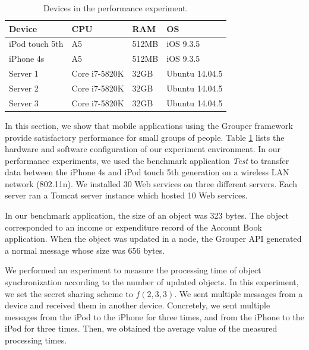 \documentclass[a4paper,11pt]{report}
\begin{document}
\begin{table}[t]
	\centering
	\caption{Devices in the performance experiment.}
	\label{table:experiment_devices}
	\begin{tabular}{llll}
		\toprule
		\textbf{Device} & \textbf{CPU} & \textbf{RAM} & \textbf{OS} \\ 
		\midrule
		iPod touch 5th & A5 & 512MB & iOS 9.3.5 \\
		iPhone 4s & A5 & 512MB & iOS 9.3.5 \\
		Server 1 & Core i7-5820K & 32GB & Ubuntu 14.04.5 \\
		Server 2 & Core i7-5820K & 32GB & Ubuntu 14.04.5 \\
		Server 3 & Core i7-5820K & 32GB & Ubuntu 14.04.5 \\ 
		\bottomrule
	\end{tabular}
\end{table}

In this section, we show that mobile applications using the Grouper framework provide satisfactory performance for small groups of people.
Table \ref{table:experiment_devices} lists the hardware and software configuration of our experiment environment.
In our performance experiments, we used the benchmark application \emph{Test} to transfer data between the iPhone 4s and iPod touch 5th generation on a wireless LAN network (802.11n).
We installed 30 Web services on three different servers.
Each server ran a Tomcat server instance which hosted 10 Web services.

In our benchmark application, the size of an object was 323 bytes.
The object corresponded to an income or expenditure record of the Account Book application.
When the object was updated in a node, the Grouper API generated a normal message whose size was 656 bytes.

We performed an experiment to measure the processing time of object synchronization according to the number of updated objects.
In this experiment, we set the secret sharing scheme to ${f(2, 3, 3)}$.
We sent multiple messages from a device and received them in another device. 
Concretely, we sent multiple messages from the iPod to the iPhone for three times, and from the iPhone to the iPod for three times.
Then, we obtained the average value of the measured processing times.
\end{document}
